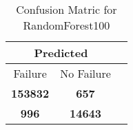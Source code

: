 \begin{table}[] 
\caption{Confusion Matric for RandomForest100} 
\label{Table: Prediction Accuracy-NoneRandomForest100100.0EKF-ignoreReflection-Reflection} 
\centering 
\begin{tabular} 
 {@{}ccc@{}} 
\toprule 
\multicolumn{2}{c}{\textbf{Predicted}}
 \\ \midrule 
\multicolumn{1}{|c|}{Failure} & 
\multicolumn{1}{c|}{No Failure}
 \\ \midrule 
\multicolumn{1}{|c|}{\color{green}\textbf{153832}} & 
\multicolumn{1}{c|}{\color{red}\textbf{657}}
 \\ \midrule 
\multicolumn{1}{|c|}{\color{red}\textbf{996}} & 
\multicolumn{1}{c|}{\color{green}\textbf{14643}}
 \\ \bottomrule 
\end{tabular} 
\end{table} 
